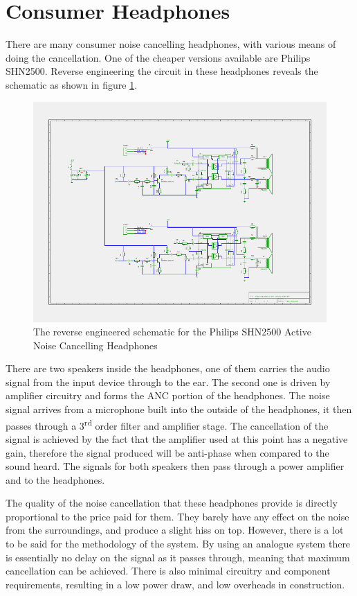 \section{Consumer Headphones}
There are many consumer noise cancelling headphones, with various means of doing the cancellation.
One of the cheaper versions available are Philips SHN2500.
Reverse engineering the circuit in these headphones reveals the schematic as shown in figure \ref{fig:philipsphonessche}.

\begin{figure}[h]
	\centering
	\includegraphics[width=\textwidth]{./img/hp.png}
	\caption{The reverse engineered schematic for the Philips SHN2500 Active Noise Cancelling Headphones}
	\label{fig:philipsphonessche}
\end{figure}

There are two speakers inside the headphones, one of them carries the audio signal from the input device through to the ear.
The second one is driven by amplifier circuitry and forms the ANC portion of the headphones.
The noise signal arrives from a microphone built into the outside of the headphones, it then passes through a 3\textsuperscript{rd} order filter and amplifier stage.
The cancellation of the signal is achieved by the fact that the amplifier used at this point has a negative gain, therefore the signal produced will be anti-phase when compared to the sound heard.
The signals for both speakers then pass through a power amplifier and to the headphones.

The quality of the noise cancellation that these headphones provide is directly proportional to the price paid for them. They barely have any effect on the noise from the surroundings, and produce a slight hiss on top.
However, there is a lot to be said for the methodology of the system. By using an analogue system there is essentially no delay on the signal as it passes through, meaning that maximum cancellation can be achieved.
There is also minimal circuitry and component requirements, resulting in a low power draw, and low overheads in construction.
